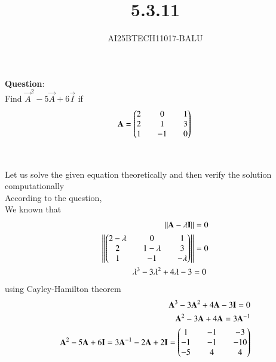 \documentclass[journal]{IEEEtran}
\begin{document}

\vspace{3cm}
\title{5.3.11}
\author{AI25BTECH11017-BALU}
 \maketitle
{\let\newpage\relax\maketitle}
\renewcommand{\thefigure}{\theenumi}
\renewcommand{\thetable}{\theenumi}
\setlength{\intextsep}{10pt} %
\renewcommand{\thetable}{\theenumi}
\textbf{Question}:\\
Find $\vec{A}^2-5\vec{A}+6\vec{I}$ if 
\begin{align}
    \mathbf{A}=\begin{pmatrix}2&&0&&1\\2&&1&&3\\1&&-1&&0\end{pmatrix}\
\end{align}
\\
\solution \\
Let us solve the given equation theoretically and then verify the solution computationally \\
According to the question, \\
We known that\\
\begin{align}
    \|\mathbf{A}-\lambda\mathbf{I}\|=0\\
    \left\|\begin{pmatrix}2-\lambda&&0&&1\\2&&1-\lambda&&3\\1&&-1&&-\lambda\end{pmatrix}\right\|=0\\
    \lambda^3-3\lambda^2+4\lambda-3=0\
\end{align}
using Cayley-Hamilton theorem
\begin{align}
    \mathbf{A}^3-3\mathbf{A}^2+4\mathbf{A}-3\mathbf{I}=0\\
    \mathbf{A}^2-3\mathbf{A}+4\mathbf{A}=3\mathbf{A}^{-1}\\
    \mathbf{A}^2-5\mathbf{A}+6\mathbf{I}=3\mathbf{A}^{-1}-2\mathbf{A}+2\mathbf{I}=\begin{pmatrix}1&&-1&&-3\\-1&&-1&&-10\\-5&&4&&4\end{pmatrix}
\end{align}
\end{document}
